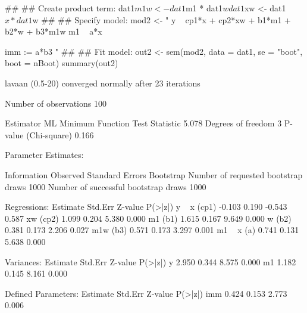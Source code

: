 \begin{Schunk}
\begin{Sinput}
 ##
 ## Create product term:
 dat1$m1w <- dat1$m1 * dat1$w
 dat1$xw <- dat1$x * dat1$w
 ##
 ## Specify model:
 mod2 <- "
 y ~ cp1*x + cp2*xw + b1*m1 + b2*w + b3*m1w
 m1 ~ a*x
 
 imm := a*b3
 "
 ##
 ## Fit model:
 out2 <- sem(mod2, data = dat1, se = "boot", boot = nBoot)
 summary(out2)
\end{Sinput}
\begin{Soutput}
lavaan (0.5-20) converged normally after  23 iterations

  Number of observations                           100

  Estimator                                         ML
  Minimum Function Test Statistic                5.078
  Degrees of freedom                                 3
  P-value (Chi-square)                           0.166

Parameter Estimates:

  Information                                 Observed
  Standard Errors                            Bootstrap
  Number of requested bootstrap draws             1000
  Number of successful bootstrap draws            1000

Regressions:
                   Estimate  Std.Err  Z-value  P(>|z|)
  y ~                                                 
    x        (cp1)   -0.103    0.190   -0.543    0.587
    xw       (cp2)    1.099    0.204    5.380    0.000
    m1        (b1)    1.615    0.167    9.649    0.000
    w         (b2)    0.381    0.173    2.206    0.027
    m1w       (b3)    0.571    0.173    3.297    0.001
  m1 ~                                                
    x          (a)    0.741    0.131    5.638    0.000

Variances:
                   Estimate  Std.Err  Z-value  P(>|z|)
    y                 2.950    0.344    8.575    0.000
    m1                1.182    0.145    8.161    0.000

Defined Parameters:
                   Estimate  Std.Err  Z-value  P(>|z|)
    imm               0.424    0.153    2.773    0.006
\end{Soutput}
\end{Schunk}
